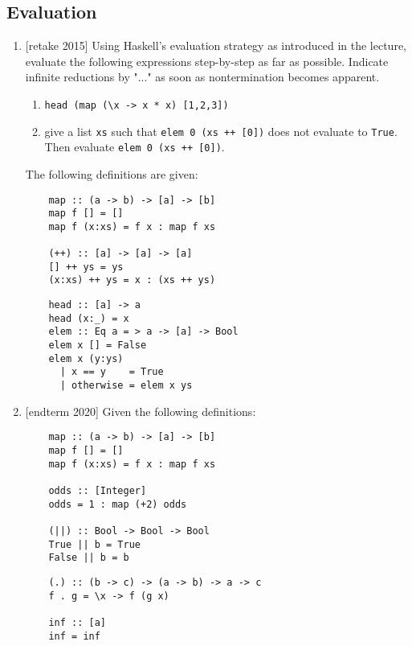 \documentclass{article}
\def\code#1{\texttt{#1}}
\begin{document}
\subsection{Evaluation}
\begin{enumerate}
    \item {[retake 2015]} Using Haskell's evaluation strategy as introduced in the lecture, evaluate the following expressions step-by-step as far as possible. Indicate infinite reductions by "..." as soon as nontermination becomes apparent.
        \begin{enumerate}
            \item \code{head (map (\textbackslash x -> x * x) [1,2,3])}
            \item give a list \code{xs} such that \code{elem 0 (xs ++ [0])} does not evaluate to \code{True}. Then evaluate \code{elem 0 (xs ++ [0])}.
        \end{enumerate}
        The following definitions are given:
        \begin{multicols}{2}
        \begin{verbatim}
    map :: (a -> b) -> [a] -> [b]
    map f [] = []
    map f (x:xs) = f x : map f xs

    (++) :: [a] -> [a] -> [a]
    [] ++ ys = ys
    (x:xs) ++ ys = x : (xs ++ ys)
        \end{verbatim}
        \begin{verbatim}
    head :: [a] -> a
    head (x:_) = x
    elem :: Eq a = > a -> [a] -> Bool
    elem x [] = False
    elem x (y:ys)
      | x == y    = True
      | otherwise = elem x ys
        \end{verbatim}
        \end{multicols}

    \item {[endterm 2020]} Given the following definitions:
        \begin{multicols}{2}
        \begin{verbatim}
    map :: (a -> b) -> [a] -> [b]
    map f [] = []
    map f (x:xs) = f x : map f xs

    odds :: [Integer]
    odds = 1 : map (+2) odds

    (||) :: Bool -> Bool -> Bool
    True || b = True
    False || b = b
        \end{verbatim}
        \begin{verbatim}
    (.) :: (b -> c) -> (a -> b) -> a -> c
    f . g = \x -> f (g x)

    inf :: [a]
    inf = inf


\end{verbatim}
\end{multicols}
\end{enumerate}
\end{document}
